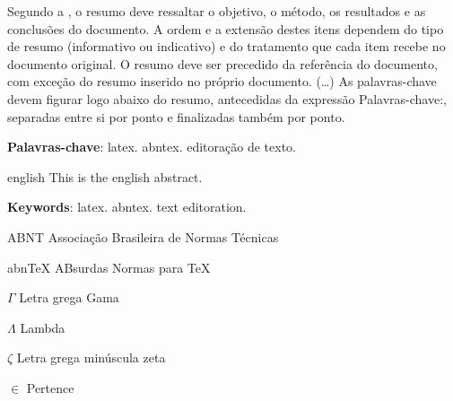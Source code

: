 \documentclass[
12pt,				%
openright,			%
twoside,			%
a4paper,			%
hyphens,
english,			%
french,				%
spanish,			%
brazil				%
]{abntex2}
\begin{document}
		
		\setlength{\absparsep}{18pt} %
		\begin{resumo}
			Segundo a , o resumo deve ressaltar o
			objetivo, o método, os resultados e as conclusões do documento. A ordem e a extensão
			destes itens dependem do tipo de resumo (informativo ou indicativo) e do
			tratamento que cada item recebe no documento original. O resumo deve ser
			precedido da referência do documento, com exceção do resumo inserido no
			próprio documento. (\ldots) As palavras-chave devem figurar logo abaixo do
			resumo, antecedidas da expressão Palavras-chave:, separadas entre si por
			ponto e finalizadas também por ponto.
			
			\textbf{Palavras-chave}: latex. abntex. editoração de texto.
		\end{resumo}
		
		\begin{resumo}[Abstract]
			\begin{otherlanguage*}{english}
				This is the english abstract.
				
				\vspace{\onelineskip}
				
				\noindent 
				\textbf{Keywords}: latex. abntex. text editoration.
			\end{otherlanguage*}
		\end{resumo}
		
		\listoffigures*
		\cleardoublepage
		
		\listoftables*
		\cleardoublepage
		
		\begin{siglas}
			\item[ABNT] Associação Brasileira de Normas Técnicas
			\item[abnTeX] ABsurdas Normas para TeX
		\end{siglas}
		
		\begin{simbolos}
			\item[$ \Gamma $] Letra grega Gama
			\item[$ \Lambda $] Lambda
			\item[$ \zeta $] Letra grega minúscula zeta
			\item[$ \in $] Pertence
		\end{simbolos}
		
\end{document}
